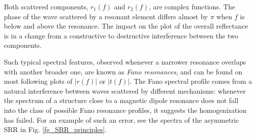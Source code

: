 Both scattered components, $r_1(f)$ and $r_2(f)$, are complex functions. The phase of the wave scattered by a resonant element differs almost by $\pi$ when $f$ is below and above the resonance. The impact on the plot of the overall reflectance is in a change from a constructive to destructive interference between the two components. 

Such typical spectral features, observed whenever a narrower resonance overlaps with another broader one, are known as \textit{Fano resonances}, and can be found on most following plots of $|r(f)|$ or $|t(f)|$. The Fano spectral profile comes from a natural interference between waves scattered by different mechanisms: whenever the spectrum of a structure close to a magnetic dipole resonance does not fall into the class of possible Fano resonance profiles, it suggests the homogenization has failed. For an example of such an error, see the spectra of the asymmetric SRR in Fig. \ref{fg_SRR_principles}.  

